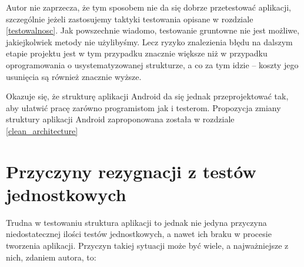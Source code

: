 Autor nie zaprzecza, że tym sposobem nie da się dobrze przetestować aplikacji, szczególnie jeżeli zastosujemy taktyki testowania opisane w rozdziale \ref{testowalnosc}. Jak powszechnie wiadomo, testowanie gruntowne nie jest możliwe, jakiejkolwiek metody nie użylibyśmy. Lecz ryzyko znalezienia błędu na dalszym etapie projektu jest w tym przypadku znacznie większe niż w przypadku oprogramowania o usystematyzowanej strukturze, a co za tym idzie – koszty jego usunięcia są również znacznie wyższe.

Okazuje się, że strukturę aplikacji Android da się jednak przeprojektować tak, aby ułatwić pracę zarówno programistom jak i testerom. Propozycja zmiany struktury aplikacji Android zaproponowana została w rozdziale \ref{clean_architecture}

\section{Przyczyny rezygnacji z testów jednostkowych}
\label{testy_jednostkowe_brak}
Trudna w testowaniu struktura aplikacji to jednak nie jedyna przyczyna niedostatecznej ilości testów jednostkowych, a nawet ich braku w procesie tworzenia aplikacji. Przyczyn takiej sytuacji może być wiele, a najważniejsze z nich, zdaniem autora, to:
